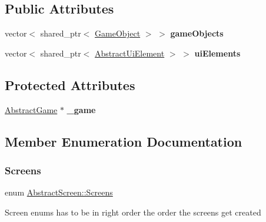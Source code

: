 \subsection*{Public Attributes}
\begin{DoxyCompactItemize}
\item 
\mbox{\label{class_abstract_screen_a4898cec711e7cdc71bcc46399e4e1a4e}} 
vector$<$ shared\+\_\+ptr$<$ \mbox{\hyperlink{class_game_object}{Game\+Object}} $>$ $>$ {\bfseries game\+Objects}
\item 
\mbox{\label{class_abstract_screen_a09109f46ca7d8662cf0b2d6c49931196}} 
vector$<$ shared\+\_\+ptr$<$ \mbox{\hyperlink{class_abstract_ui_element}{Abstract\+Ui\+Element}} $>$ $>$ {\bfseries ui\+Elements}
\end{DoxyCompactItemize}
\subsection*{Protected Attributes}
\begin{DoxyCompactItemize}
\item 
\mbox{\label{class_abstract_screen_ade20515e2fc913122f74f1989b41c15c}} 
\mbox{\hyperlink{class_abstract_game}{Abstract\+Game}} $\ast$ {\bfseries \+\_\+game}
\end{DoxyCompactItemize}


\subsection{Member Enumeration Documentation}
\mbox{\label{class_abstract_screen_a837c6697225dad22e41a384fde73c16b}} 
\subsubsection{\texorpdfstring{Screens}{Screens}}
{\footnotesize\ttfamily enum \mbox{\hyperlink{class_abstract_screen_a837c6697225dad22e41a384fde73c16b}{Abstract\+Screen\+::\+Screens}}}



Screen enums has to be in right order the order the screens get created 



